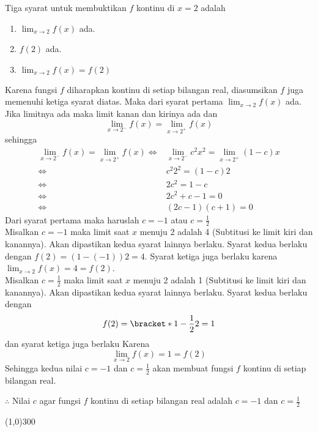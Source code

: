 \begin{enumerate}[leftmargin=*, label={\arabic*}.]
\begin{enumerate}[label={\alph*}.]
Tiga syarat untuk membuktikan $f$ kontinu di $x=2$ adalah
\begin{enumerate}[label={\arabic*}.]
    \item $\lim_{x\to 2} f(x)$ ada.
    \item $f(2)$ ada.
    \item $\lim_{x\to 2} f(x) = f(2)$
\end{enumerate}
Karena fungsi $f$ diharapkan kontinu di setiap bilangan real, diasumsikan $f$ 
juga memenuhi ketiga syarat diatas. Maka dari syarat pertama $\lim_{x\to 2} f(x)$ 
ada. Jika limitnya ada maka limit kanan dan kirinya ada dan 
\[
\lim_{x\to 2^{-}} f(x) = \lim_{x\to 2^{+}} f(x)
\]
sehingga
\begin{align*}
    \lim_{x\to 2^{-}} f(x) = \lim_{x\to 2^{+}} f(x)
    \iff &\lim_{x\to 2^{-}} c^{2}x^{2} = \lim_{x\to 2^{+}} (1-c)x\\
    \iff &c^{2}2^{2} = (1-c)2\\
    \iff &2c^{2} = 1-c\\
    \iff &2c^{2}+c-1 = 0\\
    \iff &(2c-1)(c+1) = 0
\end{align*}
Dari syarat pertama maka haruslah $c=-1$ atau $c=\frac{1}{2}$\\
Misalkan $c=-1$ maka limit saat $x$ menuju 2 adalah 4 (Subtitusi ke limit kiri dan 
kanannya). Akan dipastikan kedua syarat lainnya berlaku. Syarat kedua berlaku 
dengan $f(2) = (1-(-1))2 = 4$. Syarat ketiga juga berlaku karena 
$\lim_{x\to 2} f(x) = 4 = f(2)$.\\
Misalkan $c=\frac{1}{2}$ maka limit saat $x$ menuju 2 adalah 1 (Subtitusi ke limit 
kiri dan kanannya). Akan dipastikan kedua syarat lainnya berlaku. Syarat kedua berlaku 
dengan
\[
    f(2) = \bracket*{1-\frac{1}{2}}2 = 1
\] 
dan syarat ketiga juga berlaku Karena
\[
    \lim_{x\to 2} f(x) = 1 = f(2)
\] 
Sehingga kedua nilai $c=-1$ dan $c=\frac{1}{2}$ akan membuat fungsi $f$ 
kontinu di setiap bilangan real.

$\therefore$ Nilai $c$ agar fungsi $f$ kontinu di setiap bilangan real adalah $c=-1$ 
dan $c=\frac{1}{2}$
\begin{center}
    \line(1,0){300}
\end{center}
\end{enumerate}
\end{enumerate}
